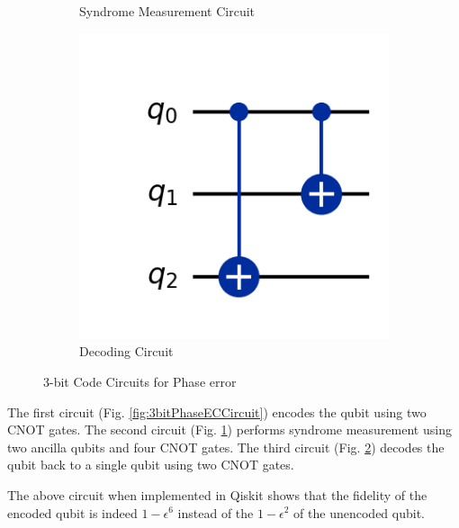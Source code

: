 \documentclass[conference]{IEEEtran}
\begin{document}
\begin{figure}[h!]
\begin{subfigure}[b]{0.3\columnwidth}
        \caption{Syndrome Measurement Circuit}
        \label{fig:3bitPhaseDecodingCircuit}
    \end{subfigure}
    \hfill
    \begin{subfigure}[b]{0.3\columnwidth}
        \centering
        \includegraphics[width=\textwidth]{../Codes/results/3bitPhaseEC/DecodingCircuit.png}
        \caption{Decoding Circuit}
        \label{fig:3bitPhaseAncillaCircuit}
    \end{subfigure}

    \caption{3-bit Code Circuits for Phase error}
    \label{fig:three_images}
\end{figure}

The first circuit (Fig. \ref{fig:3bitPhaseECCircuit}) encodes the qubit using two CNOT gates. The second circuit (Fig. \ref{fig:3bitPhaseDecodingCircuit}) performs syndrome measurement using two ancilla qubits and four CNOT gates. The third circuit (Fig. \ref{fig:3bitPhaseAncillaCircuit}) decodes the qubit back to a single qubit using two CNOT gates. 

The above circuit when implemented in Qiskit shows that the fidelity of the encoded qubit is indeed $1-\epsilon^6$ instead of the $1-\epsilon^2$ of the unencoded qubit.
\end{document}
